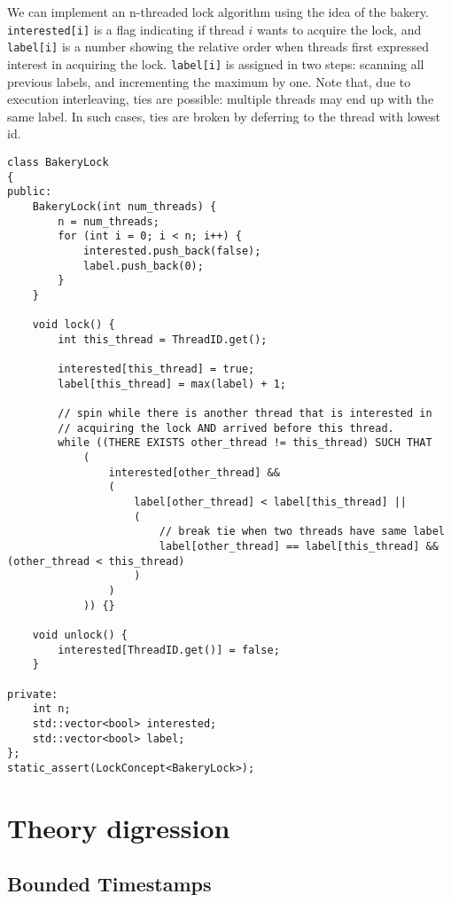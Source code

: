 We can implement an n-threaded lock algorithm using the idea of the bakery. \verb|interested[i]| is a flag indicating if thread $i$ wants to acquire the lock, and \verb|label[i]| is a number showing the relative order when threads first expressed interest in acquiring the lock. \verb|label[i]| is assigned in two steps: scanning all previous labels, and incrementing the maximum by one. Note that, due to execution interleaving, ties are possible: multiple threads may end up with the same label. In such cases, ties are broken by deferring to the thread with lowest id.

\makebox[\linewidth]{\rule{17cm}{0.4pt}}
{\centering
\begin{verbatim}
class BakeryLock
{
public:
    BakeryLock(int num_threads) {
        n = num_threads;
        for (int i = 0; i < n; i++) {
            interested.push_back(false);
            label.push_back(0);
        }
    }

    void lock() {
        int this_thread = ThreadID.get();

        interested[this_thread] = true;
        label[this_thread] = max(label) + 1;

        // spin while there is another thread that is interested in
        // acquiring the lock AND arrived before this thread.
        while ((THERE EXISTS other_thread != this_thread) SUCH THAT
            (
                interested[other_thread] &&
                (
                    label[other_thread] < label[this_thread] ||
                    (
                        // break tie when two threads have same label
                        label[other_thread] == label[this_thread] && (other_thread < this_thread)
                    )
                )
            )) {}

    void unlock() {
        interested[ThreadID.get()] = false;
    }

private:
    int n;
    std::vector<bool> interested;
    std::vector<bool> label;
};
static_assert(LockConcept<BakeryLock>);
\end{verbatim}

}
\makebox[\linewidth]{\rule{17cm}{0.4pt}}

\section{Theory digression}

\subsection{Bounded Timestamps}

